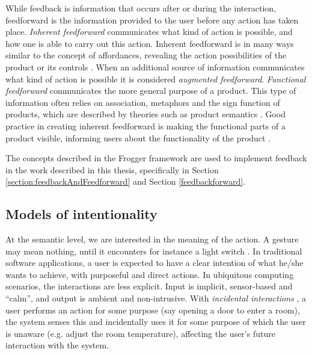 While feedback is information that occurs after or during the interaction, feedforward is the information provided to the user before any action has taken place. \emph{Inherent feedforward} communicates what kind of action is possible, and how one is able to carry out this action. Inherent feedforward is in many ways similar to the concept of affordances, revealing the action possibilities of the product or its controls \cite{Wensveen2005}. When an additional source of information communicates what kind of action is possible it is considered \emph{augmented feedforward}.  
\emph{Functional feedforward} communicates the more general purpose of a product. This type of information often relies on association, metaphors and the sign function of products, which are described by theories such as product semantics \cite{Krippendorff2006}. Good practice in creating inherent feedforward is making the functional parts of a product visible, informing users about the functionality of the product \cite{Norman1998}.	


The concepts described in the Frogger framework are used to implement feedback in the work described in this thesis, specifically in Section \ref{section:feedbackAndFeedforward} and Section \ref{feedbackforward}. 
	
\subsection{Models of intentionality}
\label{intentionalSpectrum}
	
	At the semantic level, we are interested in the meaning of the action. A gesture may mean nothing, until it encounters for instance a light switch \cite{Bongers2007}. In traditional software applications, a user is expected to have a clear intention of what he/she wants to achieve, with purposeful and direct actions. In ubiquitous computing scenarios, the interactions are less explicit. Input is implicit, sensor-based and ``calm'', and output is ambient and non-intrusive. With \emph{incidental interactions} \cite{Dix2004}, a user performs an action for some purpose (say opening a door to enter a room), the system senses this and incidentally uses it for some purpose of which the user is unaware (e.g. adjust the room temperature), affecting the user's future interaction with the system.
	
